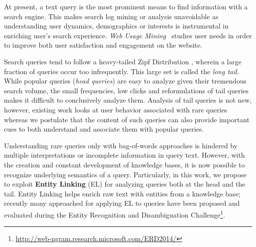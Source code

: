 At present, a text query is the most prominent means to find information with a
search engine. This makes
search log mining or analysis unavoidable as understanding user dynamics, demographics or interests
is instrumental in enriching user's search experience. \emph{Web Usage Mining}~\cite{silvestri2010mining}  
studies user needs in order to improve both user satisfaction and engagement on the website. 

Search queries tend to follow a heavy-tailed Zipf Distribution \cite{baeza2007impact}, wherein a large 
fraction of queries occur too infrequently. This large set is called the \emph{long tail}. 
While popular queries (\emph{head queries}) are easy to analyze given their tremendous search volume, the small 
frequencies, low clicks and reformulations of tail queries makes it difficult to conclusively analyze them. 
Analysis of tail queries is not new, however, existing work \cite{Doug2007Sigir,Goel2010Wsdm} looks at 
user behavior associated with rare queries whereas we postulate that the content of such queries can also 
provide important cues to both understand and associate them with popular queries. 

Understanding rare queries only with bag-of-words approaches is hindered by multiple interpretations or
incomplete information in query text. 
However, with the creation and constant development of knowledge bases, it is now possible to recognize underlying semantics
of a query. Particularly, in this work, we propose to exploit \textbf{Entity Linking} (EL) for analyzing queries 
both at the head and the tail. Entity Linking helps enrich raw text with entities from a knowledge base; recently 
many approached for applying EL to queries have been proposed and evaluated during the Entity Recognition and Disambiguation Challenge\footnote{\url{http://web-ngram.research.microsoft.com/ERD2014/}}. 



